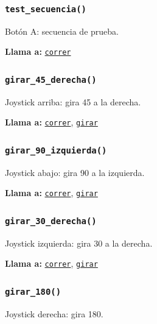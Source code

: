 \subsubsection{\texttt{test\_\allowbreak{}secuencia()}}\label{fn:funciones_rover:test-secuencia}
\noindent Botón A: secuencia de prueba.

\noindent\textbf{Llama a:} \hyperref[fn:funciones_rover:correr]{\texttt{correr}}\par

\subsubsection{\texttt{girar\_\allowbreak{}45\_\allowbreak{}derecha()}}\label{fn:funciones_rover:girar-45-derecha}
\noindent Joystick arriba: gira 45\textdegree{} a la derecha.

\noindent\textbf{Llama a:} \hyperref[fn:funciones_rover:correr]{\texttt{correr}}, \hyperref[fn:funciones_rover:girar]{\texttt{girar}}\par

\subsubsection{\texttt{girar\_\allowbreak{}90\_\allowbreak{}izquierda()}}\label{fn:funciones_rover:girar-90-izquierda}
\noindent Joystick abajo: gira 90\textdegree{} a la izquierda.

\noindent\textbf{Llama a:} \hyperref[fn:funciones_rover:correr]{\texttt{correr}}, \hyperref[fn:funciones_rover:girar]{\texttt{girar}}\par

\subsubsection{\texttt{girar\_\allowbreak{}30\_\allowbreak{}derecha()}}\label{fn:funciones_rover:girar-30-derecha}
\noindent Joystick izquierda: gira 30\textdegree{} a la derecha.

\noindent\textbf{Llama a:} \hyperref[fn:funciones_rover:correr]{\texttt{correr}}, \hyperref[fn:funciones_rover:girar]{\texttt{girar}}\par

\subsubsection{\texttt{girar\_\allowbreak{}180()}}\label{fn:funciones_rover:girar-180}
\noindent Joystick derecha: gira 180\textdegree{}.

